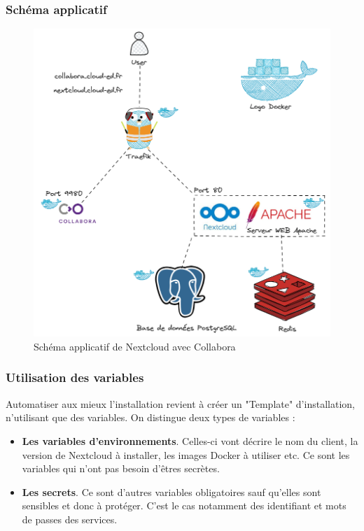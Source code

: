 \documentclass[12pt]{article}
\begin{document}
\newpage
\subsubsection{Schéma applicatif}
\begin{figure}[!ht]
    \centering
    \includegraphics[width=\textwidth]{src/Nextcloud stack.png}
    \caption{Schéma applicatif de \gls{Nextcloud} avec \gls{Collabora}}
    \label{fig:nextcloudXcollabora}
\end{figure}

\newpage
\subsubsection{Utilisation des variables}
Automatiser aux mieux l'installation revient à créer un "Template" d'installation, n'utilisant que des variables. 
On distingue deux types de variables :
\begin{itemize}
    \item \textbf{Les variables d'environnements}. Celles-ci vont décrire le nom du client, la version de \gls{Nextcloud} à installer, les images Docker à utiliser etc. 
    Ce sont les variables qui n'ont pas besoin d'êtres secrètes.
    \item \textbf{Les secrets}. Ce sont d'autres variables obligatoires sauf qu'elles sont sensibles et donc à protéger. 
    C'est le cas notamment des identifiant et mots de passes des services.
\end{itemize}
\end{document}
